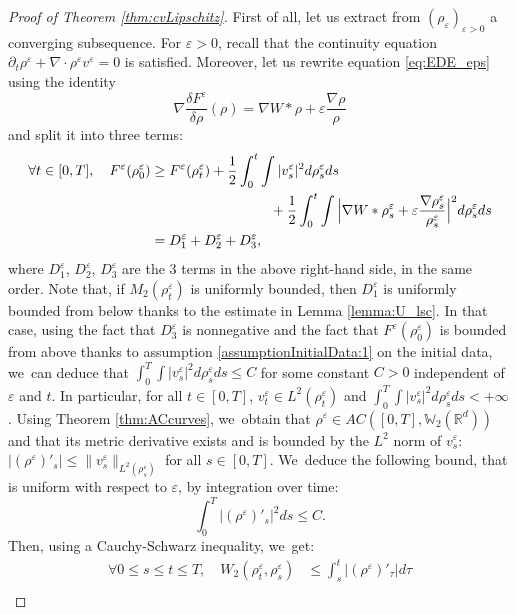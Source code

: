 \documentclass[JEP,XML,SOM,Unicode, NoFloatCountersInSection,published]{cedram}
\def\RR{\mathbb{R}}
\def\WW{\mathbb{W}}
\def\eps{\varepsilon}
\def\pa{\partial}
\theoremstyle{plain}
\theoremstyle{definition}
\begin{document}
\begin{proof}[Proof of Theorem \ref{thm:cvLipschitz}]
First of all, let us extract from $(\rho_\eps)_{\eps>0}$ a converging subsequence. For $\eps > 0$, recall that the continuity equation $\pa_t \rho^\eps + \nabla \cdot \rho^\eps v^\eps = 0$ is satisfied. Moreover, let us rewrite equation \eqref{eq:EDE_eps} using the identity
\[
\nabla \dfrac{\delta F^\eps}{\delta \rho}(\rho) = \nabla W * \rho + \eps \dfrac{\nabla \rho}{\rho}
\]
and split it into three terms:
\begin{equation}\label{eq:EDE_eps_split}
\begin{aligned}
\forall t \in [0,T], \quad F^\eps(\rho_0^\eps) &\geq F^\eps(\rho^\eps_t) + \frac 12 \int_0^t \int |v^\eps_s|^2 d\rho^\eps_s ds\\
&\hspace*{3cm}+ \frac 12 \int_0^t \int \Big| \nabla W * \rho^\eps_s + \eps \frac{\nabla \rho^\eps_s}{\rho^\eps_s} \Big|^2 d\rho^\eps_s ds \\
&= D_1^\eps + D_2^\eps + D_3^\eps,
\end{aligned}
\end{equation}
where $D_1^\eps$, $D_2^\eps$, $D_3^\eps$ are the 3 terms in the above right-hand side, in the same order.
Note that, if $M_2(\rho_t^\eps)$ is uniformly bounded, then $D_1^\eps$ is uniformly bounded from below thanks to the estimate in Lemma \ref{lemma:U_lsc}. In that case, using the fact that $D_3^\eps$ is nonnegative and the fact that $F^\eps(\rho_0^\eps)$ is bounded from above thanks to assumption \eqref{assumptionInitialData:1} on the initial data, we~can deduce that $\int_0^T \int |v^\eps_s|^2 d\rho^\eps_s ds \leq C$ for some constant $C>0$ independent of~$\eps$ and $t$. In particular, for all $t \in [0,T]$, $v_t^\eps \in L^2(\rho_t^\eps)$ and $\int_0^T \int |v^\eps_s|^2 d\rho^\eps_s ds < +\infty$. Using Theorem \ref{thm:ACcurves}, we~obtain that $\rho^\eps \in AC([0,T], \WW_2(\RR^d))$ and that its metric derivative exists and is bounded by the $L^2$ norm of $v^\eps_s$: $|(\rho^\eps)'_s| \leq \|v^\eps_s\|_{L^2(\rho^\eps_s)}$ for all $s \in [0,T]$. We~deduce the following bound, that is uniform with respect to $\eps$, by integration over time:
\[
\int_0^T |(\rho^\eps)'_s|^2 ds \leq C.
\]
Then, using a Cauchy-Schwarz inequality, we~get:
\begin{equation}\label{eq:rhoEpsHolder}
\begin{aligned}
\forall 0 \leq s \leq t \leq T, \quad W_2(\rho_t^\eps, \rho_s^\eps) &\leq \int_s^t |(\rho^\eps)'_\tau| d\tau \\

\end{aligned}
\end{equation}
\end{proof}
\end{document}
